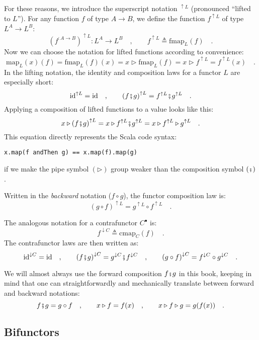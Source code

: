 For these reasons, we introduce the superscript notation $^{\uparrow L}$
(pronounced \textsf{``}lifted to $L$\textsf{''}). For any function $f$ of type $A\rightarrow B$,
we define the function $f^{\uparrow L}$ of type $L^{A}\rightarrow L^{B}$:
\[
(f^{:A\rightarrow B})^{\uparrow L}:L^{A}\rightarrow L^{B}\quad,\quad\quad f^{\uparrow L}\triangleq\text{fmap}_{L}(f)\quad.
\]
Now we can choose the notation for lifted functions according to convenience:
\[
\text{map}_{L}(x)(f)=\text{fmap}_{L}(f)(x)=x\triangleright\text{fmap}_{L}(f)=x\triangleright f^{\uparrow L}=f^{\uparrow L}(x)\quad.
\]
In the lifting notation,
the identity and composition laws for a functor $L$ are especially
short:
\[
\text{id}^{\uparrow L}=\text{id}\quad,\quad\quad\left(f\bef g\right)^{\uparrow L}=f^{\uparrow L}\bef g^{\uparrow L}\quad.
\]
Applying a composition of lifted functions to a value looks like this:
\[
x\triangleright\left(f\bef g\right)^{\uparrow L}=x\triangleright f^{\uparrow L}\bef g^{\uparrow L}=x\triangleright f^{\uparrow L}\triangleright g^{\uparrow L}\quad.
\]
This equation directly represents the Scala code syntax:
\begin{lstlisting}
x.map(f andThen g) == x.map(f).map(g)
\end{lstlisting}
if we make the pipe symbol $\left(\triangleright\right)$ group weaker
than the composition symbol $\left(\bef\right)$.

Written in the \emph{backward} notation ($f\circ g$), the functor
composition law is:
\[
\left(g\circ f\right)^{\uparrow L}=g^{\uparrow L}\circ f^{\uparrow L}\quad.
\]

The analogous notation for a contrafunctor $C^{\bullet}$ is:
\[
f^{\downarrow C}\triangleq\text{cmap}_{C}(f)\quad.
\]
The contrafunctor laws are then written as:
\[
\text{id}^{\downarrow C}=\text{id}\quad,\quad\quad\left(f\bef g\right)^{\downarrow C}=g^{\downarrow C}\bef f^{\downarrow C}\quad,\quad\quad\left(g\circ f\right)^{\downarrow C}=f^{\downarrow C}\circ g^{\downarrow C}\quad.
\]

We will almost always use the forward composition $f\bef g$ in this
book, keeping in mind that one can straightforwardly and mechanically
translate between forward and backward notations:
\[
f\bef g=g\circ f\quad,\quad\quad x\triangleright f=f(x)\quad,\quad\quad x\triangleright f\triangleright g=g(f(x))\quad.
\]


\subsection{Bifunctors\label{subsec:Bifunctors}}

